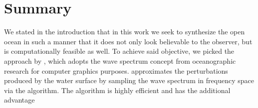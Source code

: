 \chapter{Summary}
\label{ch:summary}
%
%
We stated in the introduction that in this work we seek to synthesize the open
ocean in such a manner that it does not only look believable to the observer,
but is computationally feasible as well.
%
To achieve said objective, we picked the approach by \citet{course:simulatingocean},
which adopts the wave spectrum concept from oceanographic research for
computer graphics purposes.
\citeauthor{course:simulatingocean} approximates the
perturbations produced by the water surface by sampling the wave
spectrum in frequency space via the \FastFourierTransform algorithm.
%
%
The \FFT algorithm is highly efficient and has the additional advantage
